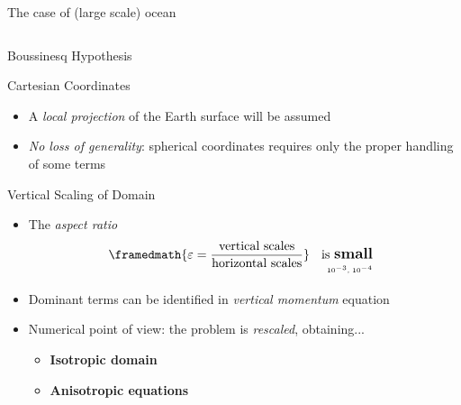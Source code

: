 \begin{frame}{The case of (large scale) ocean}
\begin{itemize}
\begin{columns}
\begin{overprint}
\begin{block}{Boussinesq Hypothesis}
\begin{itemize}
          \end{itemize}
        \end{block}
        \begin{block}{Cartesian Coordinates}
          \begin{itemize}
          \item A \textit{local projection} of the Earth surface will be
            assumed
          \item \textit{No loss of generality}: spherical coordinates requires
            only the proper handling of some terms
          \end{itemize}
        \end{block}
        \begin{block}{Vertical Scaling of Domain}
          \vspace{-0.5em}
          \begin{itemize}
          \item The \textit{aspect ratio}
            \begin{equation*}
              \framedmath{\displaystyle\varepsilon = \frac{\text{vertical
                    scales}}{\text{horizontal scales}}}~
                \begin{tabular}[t]{l} is \large\textbf{small} \\[-0.2ex]
                  \tiny\it ~ $10^{-3}$, $10^{-4}$\end{tabular}
            \end{equation*}
          \item Dominant terms can be identified in
            \textit{vertical momentum} equation
          \item Numerical point of view: the problem is
            \textit{rescaled}, obtaining...
            \begin{itemize}
            \item \alert{\textbf{Isotropic domain}}
            \item \alert{\textbf{Anisotropic equations}}
            \end{itemize}
          \end{itemize}
        \end{block}
      \end{overprint}
    \end{columns}
  \end{itemize}


\end{frame}
